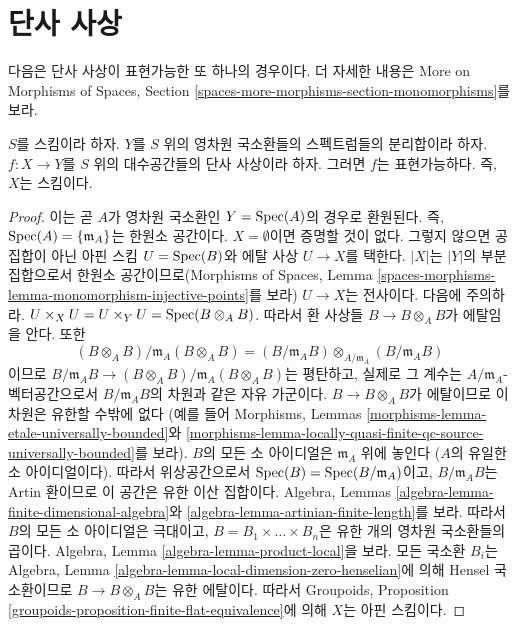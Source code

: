 \section{단사 사상}
\label{section-monomorphisms}

\noindent
다음은 단사 사상이 표현가능한 또 하나의 경우이다. 더 자세한 내용은
More on Morphisms of Spaces, Section
\ref{spaces-more-morphisms-section-monomorphisms}를 보라.

\begin{lemma}
\label{lemma-monomorphism-toward-disjoint-union-dim-0-rings}
$S$를 스킴이라 하자. $Y$를 $S$ 위의 영차원 국소환들의
스펙트럼들의 분리합이라 하자.
$f : X \to Y$를 $S$ 위의 대수공간들의 단사 사상이라 하자.
그러면 $f$는 표현가능하다. 즉, $X$는 스킴이다.
\end{lemma}

\begin{proof}
이는 곧 $A$가 영차원 국소환인 $Y = \mathop{\mathrm{Spec}}(A)$의 경우로 환원된다.
즉, $\mathop{\mathrm{Spec}}(A) = \{\mathfrak m_A\}$는 한원소 공간이다.
$X = \emptyset$이면 증명할 것이 없다. 그렇지 않으면 공집합이 아닌
아핀 스킴 $U = \mathop{\mathrm{Spec}}(B)$와 에탈 사상 $U \to X$를 택한다.
$|X|$는 $|Y|$의 부분집합으로서 한원소 공간이므로(Morphisms of Spaces,
Lemma \ref{spaces-morphisms-lemma-monomorphism-injective-points}를 보라)
$U \to X$는 전사이다. 다음에 주의하라.
$U \times_X U = U \times_Y U = \mathop{\mathrm{Spec}}(B \otimes_A B)$.
따라서 환 사상들 $B \to B \otimes_A B$가 에탈임을 안다.
또한
$$
(B \otimes_A B)/\mathfrak m_A(B \otimes_A B)
=
(B/\mathfrak m_AB) \otimes_{A/\mathfrak m_A} (B/\mathfrak m_AB)
$$
이므로
$B/\mathfrak m_AB \to (B \otimes_A B)/\mathfrak m_A(B \otimes_A B)$는
평탄하고, 실제로 그 계수는 $A/\mathfrak m_A$-벡터공간으로서
$B/\mathfrak m_AB$의 차원과 같은 자유 가군이다.
$B \to B \otimes_A B$가 에탈이므로 이 차원은 유한할 수밖에 없다
(예를 들어 Morphisms, Lemmas
\ref{morphisms-lemma-etale-universally-bounded}와
\ref{morphisms-lemma-locally-quasi-finite-qc-source-universally-bounded}를
보라). $B$의 모든 소 아이디얼은 $\mathfrak m_A$ 위에 놓인다
($A$의 유일한 소 아이디얼이다). 따라서 위상공간으로서
$\mathop{\mathrm{Spec}}(B) = \mathop{\mathrm{Spec}}(B/\mathfrak m_A)$이고, $B/\mathfrak m_A B$는
Artin 환이므로 이 공간은 유한 이산 집합이다. Algebra, Lemmas
\ref{algebra-lemma-finite-dimensional-algebra}와
\ref{algebra-lemma-artinian-finite-length}를 보라.
따라서 $B$의 모든 소 아이디얼은 극대이고,
$B = B_1 \times \ldots \times B_n$은 유한 개의 영차원 국소환들의
곱이다. Algebra, Lemma \ref{algebra-lemma-product-local}을 보라.
모든 국소환 $B_i$는 Algebra, Lemma
\ref{algebra-lemma-local-dimension-zero-henselian}에 의해 Hensel
국소환이므로 $B \to B \otimes_A B$는 유한 에탈이다.
따라서 Groupoids, Proposition
\ref{groupoids-proposition-finite-flat-equivalence}에 의해 $X$는
아핀 스킴이다.
\end{proof}

